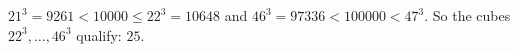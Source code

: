 $21^3=9261<10000\le22^3=10648$ and $46^3=97336<100000<47^3$. So the cubes $22^3,\dots,46^3$ qualify: $\boxed{25}$.
